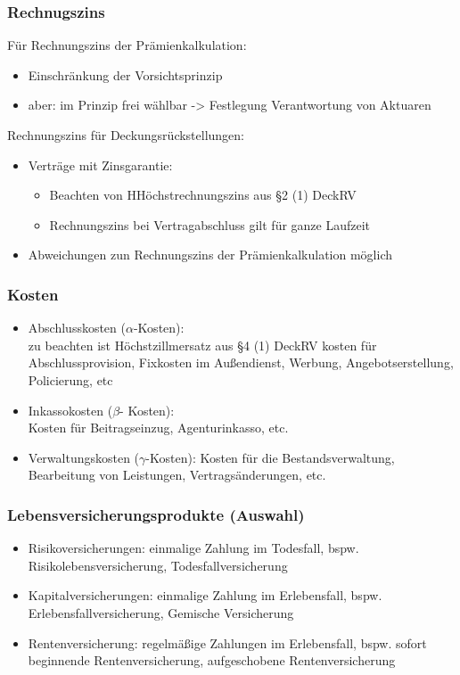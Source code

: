 \documentclass[12pt]{report}
\theoremstyle{dotless}
\theoremstyle{definition}
\begin{document}
\subsubsection{Rechnugszins}
Für Rechnungszins der Prämienkalkulation:
\begin{itemize}
\item Einschränkung der Vorsichtsprinzip
\item aber: im Prinzip frei wählbar -> Festlegung Verantwortung von Aktuaren
\end{itemize}
Rechnungszins für Deckungsrückstellungen:
\begin{itemize}
\item Verträge mit Zinsgarantie:
\begin{itemize}
\item Beachten von HHöchstrechnungszins aus §2 (1) DeckRV
\item Rechnungszins bei Vertragabschluss gilt für ganze Laufzeit
\end{itemize}
\item Abweichungen zun Rechnungszins der Prämienkalkulation möglich
\end{itemize}

\subsubsection{Kosten}
\begin{itemize}
\item Abschlusskosten ($\alpha$-Kosten):\\
zu beachten ist Höchstzillmersatz aus §4 (1) DeckRV kosten für Abschlussprovision, Fixkosten im Außendienst, Werbung, Angebotserstellung, Policierung, etc
\item Inkassokosten ($\beta$- Kosten):\\
Kosten für Beitragseinzug, Agenturinkasso, etc.
\item Verwaltungskosten ($\gamma$-Kosten):
Kosten für die Bestandsverwaltung, Bearbeitung von Leistungen, Vertragsänderungen, etc.
\end{itemize}

\subsubsection{Lebensversicherungsprodukte (Auswahl)}
\begin{itemize}
\item Risikoversicherungen: einmalige Zahlung im Todesfall, bspw. Risikolebensversicherung, Todesfallversicherung
\item Kapitalversicherungen: einmalige Zahlung im Erlebensfall, bspw. Erlebensfallversicherung, Gemische Versicherung
\item Rentenversicherung: regelmäßige Zahlungen im Erlebensfall, bspw. sofort beginnende Rentenversicherung, aufgeschobene Rentenversicherung
\end{itemize}
\end{document}
